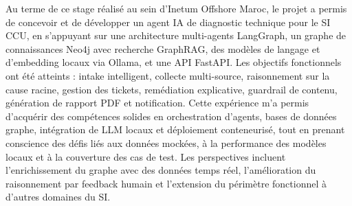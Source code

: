 \conclusion
Au terme de ce stage réalisé au sein d'Inetum Offshore Maroc, le projet a permis de concevoir et de développer un agent IA de diagnostic technique pour le SI CCU, en s'appuyant sur une architecture multi-agents LangGraph, un graphe de connaissances Neo4j avec recherche GraphRAG, des modèles de langage et d'embedding locaux via Ollama, et une API FastAPI. Les objectifs fonctionnels ont été atteints : intake intelligent, collecte multi-source, raisonnement sur la cause racine, gestion des tickets, remédiation explicative, guardrail de contenu, génération de rapport PDF et notification. Cette expérience m'a permis d'acquérir des compétences solides en orchestration d'agents, bases de données graphe, intégration de LLM locaux et déploiement conteneurisé, tout en prenant conscience des défis liés aux données mockées, à la performance des modèles locaux et à la couverture des cas de test. Les perspectives incluent l'enrichissement du graphe avec des données temps réel, l'amélioration du raisonnement par feedback humain et l'extension du périmètre fonctionnel à d'autres domaines du SI.
